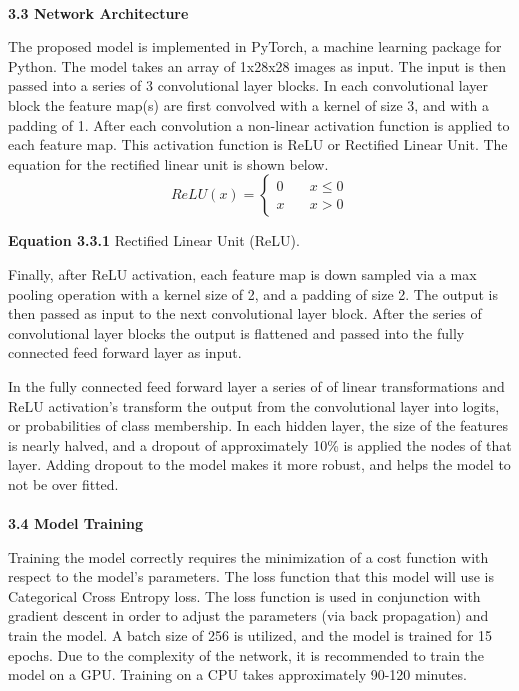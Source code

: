 \documentclass[11pt]{article}
\begin{document}
\begin{multicols}{2}
\\
\textbf{3.3 Network Architecture}
\par
The proposed model is implemented in PyTorch, a machine learning package for Python.  The model takes an array of 1x28x28 images as input.  The input is then passed into a series of 3 convolutional layer blocks.  In each convolutional layer block the feature map(s) are first convolved with a kernel of size 3, and with a padding of 1.  After each convolution a non-linear activation function is applied to each feature map.  This activation function is ReLU or Rectified Linear Unit.  The equation for the rectified linear unit is shown below.
$$
ReLU(x) = \left\{
        \begin{array}{ll}
            0 & \quad x \leq 0 \\
            x & \quad x > 0
        \end{array}
    \right.
$$
\begin{center}
\textbf{Equation 3.3.1} Rectified Linear Unit (ReLU).
\end{center}

\par
Finally, after ReLU activation, each feature map is down sampled via a max pooling operation with a kernel size of 2, and a padding of size 2.  The output is then passed as input to the next convolutional layer block.  After the series of convolutional layer blocks the output is flattened and passed into the fully connected feed forward layer as input.
\par
In the fully connected feed forward layer a series of of linear transformations and ReLU activation's transform the output from the convolutional layer into logits, or probabilities of class membership.  In each hidden layer, the size of the features is nearly halved, and a dropout of approximately 10\% is applied the nodes of that layer.  Adding dropout to the model makes it more robust, and helps the model to not be over fitted.
\\ \\
\textbf{3.4 Model Training}
\par
Training the model correctly requires the minimization of a cost function with respect to the model's parameters.  The loss function that this model will use is Categorical Cross Entropy loss.  The loss function is used in conjunction with gradient descent in order to adjust the parameters (via back propagation) and train the model.  A batch size of 256 is utilized, and the model is trained for 15 epochs.  Due to the complexity of the network, it is recommended to train the model on a GPU.  Training on a CPU takes approximately 90-120 minutes.

\end{multicols}
\end{document}
